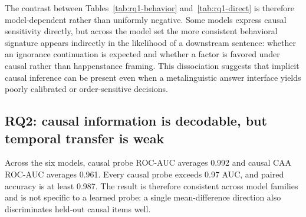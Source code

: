 \begin{table}[t]
\centering
\scriptsize
{}
\caption{Direct behavioral judgments on the same 300 held-out items. Scores are averaged within item across the Yes-or-No and No-or-Yes orders or across the ascending and reversed Likert anchors before computing the threshold-free pair-accuracy and ROC-AUC measures.}
\label{tab:rq1-direct}
\end{table}

The contrast between Tables~\ref{tab:rq1-behavior} and~\ref{tab:rq1-direct} is therefore model-dependent rather than uniformly negative. Some models express causal sensitivity directly, but across the model set the more consistent behavioral signature appears indirectly in the likelihood of a downstream sentence: whether an ignorance continuation is expected and whether a factor is favored under causal rather than happenstance framing. This dissociation suggests that implicit causal inference can be present even when a metalinguistic answer interface yields poorly calibrated or order-sensitive decisions.

\subsection{RQ2: causal information is decodable, but temporal transfer is weak}
Across the six models, causal probe ROC-AUC averages 0.992 and causal CAA ROC-AUC averages 0.961. Every causal probe exceeds 0.97 AUC, and paired accuracy is at least 0.987. The result is therefore consistent across model families and is not specific to a learned probe: a single mean-difference direction also discriminates held-out causal items well.

